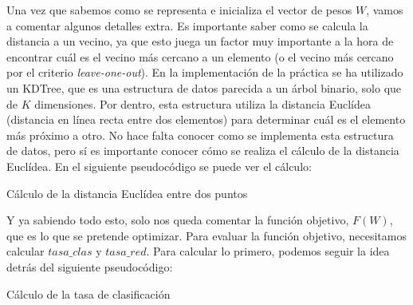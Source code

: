 \documentclass[11pt,a4paper]{article}
\begin{document}
Una vez que sabemos como se representa e inicializa el vector de pesos $W$, vamos a comentar algunos detalles extra. Es
importante saber como se calcula la distancia a un vecino, ya que esto juega un factor muy importante a la hora de encontrar
cuál es el vecino más cercano a un elemento (o el vecino más cercano por el criterio \textit{leave-one-out}). En la
implementación de la práctica se ha utilizado un KDTree, que es una estructura de datos parecida a un árbol binario, solo que
de $K$ dimensiones. Por dentro, esta estructura utiliza la distancia Euclídea (distancia en línea recta entre
dos elementos) para determinar cuál es el elemento más próximo a otro. No hace falta conocer como se implementa esta estructura
de datos, pero sí es importante conocer cómo se realiza el cálculo de la distancia Euclídea. En el siguiente pseudocódigo se
puede ver el cálculo:

\begin{algorithm}[H]
\caption{Cálculo de la distancia Euclídea entre dos puntos}


\end{algorithm}

Y ya sabiendo todo esto, solo nos queda comentar la función objetivo, $F(W)$, que es lo que se pretende optimizar. Para evaluar
la función objetivo, necesitamos calcular $tasa\_clas$ y $tasa\_red$. Para calcular lo primero, podemos seguir la idea
detrás del siguiente pseudocódigo:

\begin{algorithm}[H]
\caption{Cálculo de la tasa de clasificación}


\end{algorithm}
\end{document}
